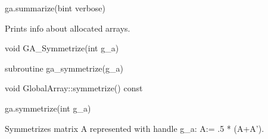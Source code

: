 \documentclass[12pt]{article}
\begin{document}
\begin{pyapi}
\begin{pycode}
ga.summarize(bint verbose)
\end{pycode}
\begin{funcargs}
\end{funcargs}
\end{pyapi}

\local

\begin{desc}
Prints info about allocated arrays.
\end{desc}


\begin{capi}
\begin{ccode}
void GA_Symmetrize(int g_a)
\end{ccode}
\begin{funcargs}
\end{funcargs}
\end{capi}

\begin{fapi}
\begin{fcode}
subroutine ga_symmetrize(g_a)
\end{fcode}
\begin{funcargs}
\end{funcargs}
\end{fapi}

\begin{cxxapi}
\begin{cxxcode}
void GlobalArray::symmetrize() const
\end{cxxcode}
\end{cxxapi}

\begin{pyapi}
\begin{pycode}
ga.symmetrize(int g_a)
\end{pycode}
\begin{funcargs}
\end{funcargs}
\end{pyapi}

\gcoll

\begin{desc}
Symmetrizes matrix A represented with handle g_a: A:= .5 * (A+A').
\end{desc}

\end{document}

